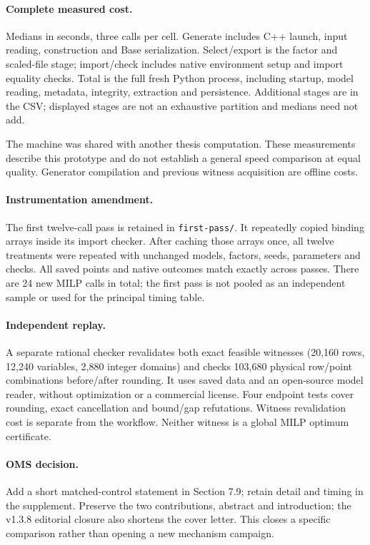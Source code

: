 \documentclass[10pt,a4paper]{article}
\begin{document}
\paragraph{Complete measured cost.} Medians in seconds, three calls per cell.
Generate includes C++ launch, input reading, construction and Base serialization.
Select/export is the factor and scaled-file stage; import/check includes native
environment setup and import equality checks. Total is the full fresh Python
process, including startup, model reading, metadata, integrity, extraction and
persistence. Additional stages are in the CSV; displayed stages are not an
exhaustive partition and medians need not add.
\begin{center}\small

\end{center}
The machine was shared with another thesis computation. These measurements
describe this prototype and do not establish a general speed comparison at equal
quality. Generator compilation and previous witness acquisition are offline costs.

\paragraph{Instrumentation amendment.} The first twelve-call pass is retained in
\texttt{first-pass/}. It repeatedly copied binding arrays inside its import checker.
After caching those arrays once, all twelve treatments were repeated with unchanged
models, factors, seeds, parameters and checks. All saved points and native outcomes
match exactly across passes. There are 24 new MILP calls in total; the first pass
is not pooled as an independent sample or used for the principal timing table.

\paragraph{Independent replay.} A separate rational checker revalidates both exact
feasible witnesses (20,160 rows, 12,240 variables, 2,880 integer domains) and checks
103,680 physical row/point combinations before/after rounding. It uses saved data
and an open-source model reader, without optimization or a commercial license.
Four endpoint tests cover rounding, exact cancellation and bound/gap refutations.
Witness revalidation cost is separate from the workflow. Neither witness is a
global MILP optimum certificate.

\paragraph{OMS decision.} Add a short matched-control statement in Section 7.9;
retain detail and timing in the supplement. Preserve the two contributions,
abstract and introduction; the v1.3.8 editorial closure also shortens the cover letter.
This closes a specific comparison rather
than opening a new mechanism campaign.
\end{document}
